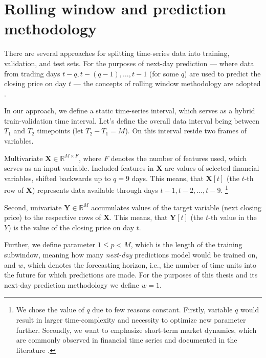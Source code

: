 \section{Rolling window and prediction methodology}
\label{rolling}
There are several approaches for splitting time-series data into training, validation, and test sets. For the purposes of next-day prediction — where data from trading days $t-q, t-(q-1), \dots, t-1$ 
(for some $q$) are used to predict the closing price on day $t$ — the concepts of rolling window methodology are adopted \cite{forecast_book}.
\par
In our approach, we define a static time-series interval, which serves as a hybrid train-validation time interval. Let's define the overall data interval being between
$T_1$ and $T_2$ timepoints (let $T_2-T_1=M$). On this interval reside two frames of variables. 

Multivariate $\mathbf{X} \in \mathbb{R}^{M \times F}$, where $F$ denotes the number of features used, which serves 
as an input variable. Included features in $\mathbf{X}$ are values of selected financial variables, shifted backwards up to $q=9$ days. This means, that 
$\mathbf{X}[t]$ (the $t$-th row of $\mathbf{X}$) represents data available through days $t-1, t-2, \ldots, t-9$. \footnote{We chose the value of $q$ due to few reasons constant. Firstly, variable $q$ 
would result in larger time-complexity and necessity to optimize new parameter further. Secondly, we want to emphasize short-term market dynamics,
which are commonly observed in financial time series and documented in the literature \cite{forecast_book}.} 

Second, univariate $\mathbf{Y} \in \mathbb{R}^M$ accumulates values of the target variable (next closing price) to the respective rows of $\mathbf{X}$. This means, that $\mathbf{Y}[t]$ (the $t$-th value in the $Y$) is the value of the closing price on day $t$.
\par
Further, we define parameter $1 \leq p<M$, which is the length of the training subwindow, meaning how many \textit{next-day} predictions model would be trained on,
and $w$, which denotes the forecasting horizon, i.e., the number of time units into the future for which predictions are made. For the purposes of this thesis and its next-day prediction methodology we define $w=1$.

